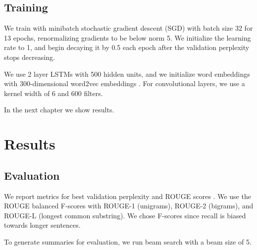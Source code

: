 \documentclass[11pt]{report}
\begin{document}


\section{Training}

We train with minibatch stochastic gradient descent (SGD) with batch size 32 for 13 epochs, renormalizing gradients to be below norm 5. We initialize the learning rate to 1, and begin decaying it by 0.5 each epoch after the validation perplexity stops decreasing. 

We use 2 layer LSTMs with 500 hidden units, and we initialize word embeddings with 300-dimensional word2vec embeddings \citep{mikolov2013word2vec}. For convolutional layers, we use a kernel width of 6 and 600 filters.


In the next chapter we show results.

\chapter{Results}

\section{Evaluation} %

We report metrics for best validation perplexity and ROUGE scores \citep{lin2004rouge}. We use the ROUGE balanced F-scores with ROUGE-1 (unigrams), ROUGE-2 (bigrams), and ROUGE-L (longest common substring). We chose F-scores since recall is biased towards longer sentences.

To generate summaries for evaluation, we run beam search with a beam size of 5.
\end{document}
